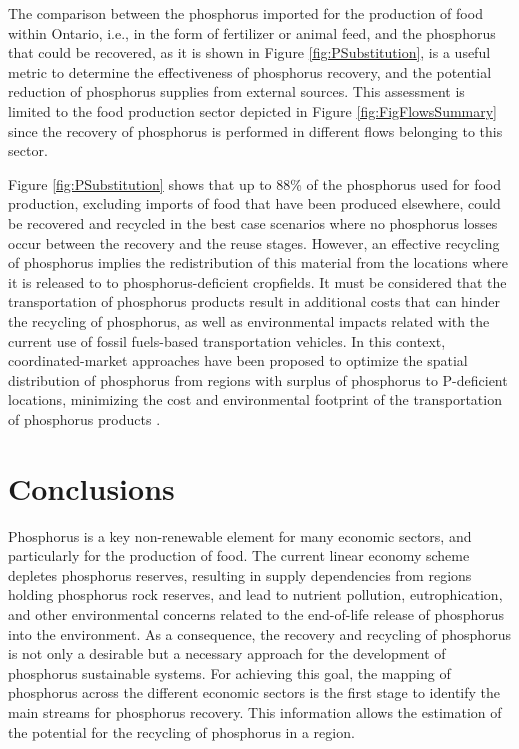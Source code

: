 \documentclass[]{elsarticle}
\begin{document}
The comparison between the phosphorus imported for the production of food within Ontario, i.e., in the form of fertilizer or animal feed, and the phosphorus that could be recovered, as it is shown in Figure \ref{fig:PSubstitution}, is a useful metric to determine the effectiveness of phosphorus recovery, and the potential reduction of phosphorus supplies from external sources. This assessment is limited to the food production sector depicted in Figure \ref{fig:FigFlowsSummary} since the recovery of phosphorus is performed in different flows belonging to this sector.

Figure \ref{fig:PSubstitution} shows that up to 88\% of the phosphorus used for food production, excluding imports of food that have been produced elsewhere, could be recovered and recycled in the best case scenarios where no phosphorus losses occur between the recovery and the reuse stages. However, an effective recycling of phosphorus implies the redistribution of this material from the locations where it is released to
to phosphorus-deficient cropfields.
It must be considered that the transportation of phosphorus products result in additional costs that can hinder the recycling of phosphorus, as well as environmental impacts related with the current use of fossil fuels-based transportation vehicles. In this context, coordinated-market approaches have been proposed to optimize the spatial distribution of phosphorus from regions with surplus of phosphorus to P-deficient locations, minimizing the cost and environmental footprint of the transportation of phosphorus products \citep{sampat2019coordinated}. 
%

\section{Conclusions}
Phosphorus is a key non-renewable element for many economic sectors, and particularly for the production of food. The current linear economy scheme depletes phosphorus reserves, resulting in supply dependencies from regions holding phosphorus rock reserves, and lead to nutrient pollution, eutrophication, and other environmental concerns related to the end-of-life release of phosphorus into the environment. As a consequence, the recovery and recycling of phosphorus is not only a desirable but a necessary approach for the development of phosphorus sustainable systems. For achieving this goal, the mapping of phosphorus across the different economic sectors is the first stage to identify the main streams for phosphorus recovery. This information allows the estimation of the potential for the recycling of phosphorus in a region.
\end{document}
